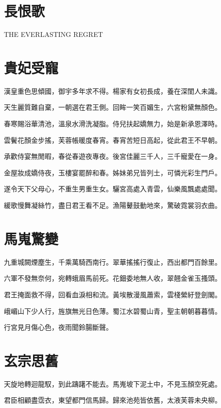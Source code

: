 \documentclass[UTF8]{ctexart}
\begin{document}
\tableofcontents

\newpage

\section*{長恨歌}

THE EVERLASTING REGRET

\section{貴妃受寵}

漢皇重色思傾國，御宇多年求不得。楊家有女初長成，養在深閨人未識。

天生麗質難自棄，一朝選在君王側。回眸一笑百媚生，六宮粉黛無顏色。

春寒賜浴華清池，溫泉水滑洗凝脂。侍兒扶起嬌無力，始是新承恩澤時。

雲鬢花顏金步搖，芙蓉帳暖度春宵。春宵苦短日高起，從此君王不早朝。

承歡侍宴無閒暇，春從春遊夜專夜。後宮佳麗三千人，三千寵愛在一身。

金屋妝成嬌侍夜，玉樓宴罷醉和春。姊妹弟兄皆列土，可憐光彩生門戶。

遂令天下父母心，不重生男重生女。驪宮高處入青雲，仙樂風飄處處聞。

緩歌慢舞凝絲竹，盡日君王看不足。漁陽鼙鼓動地來，驚破霓裳羽衣曲。

\section{馬嵬驚變}

九重城闕煙塵生，千乘萬騎西南行。翠華搖搖行復止，西出都門百餘里。

六軍不發無奈何，宛轉蛾眉馬前死。花鈿委地無人收，翠翹金雀玉搔頭。

君王掩面救不得，回看血淚相和流。黃埃散漫風蕭索，雲棧縈紆登劍閣。

峨嵋山下少人行，旌旗無光日色薄。蜀江水碧蜀山青，聖主朝朝暮暮情。

行宮見月傷心色，夜雨聞鈴腸斷聲。

\section{玄宗思舊}

天旋地轉迴龍馭，到此躊躇不能去。馬嵬坡下泥土中，不見玉顏空死處。

君臣相顧盡霑衣，東望都門信馬歸。歸來池苑皆依舊，太液芙蓉未央柳。
\end{document}
